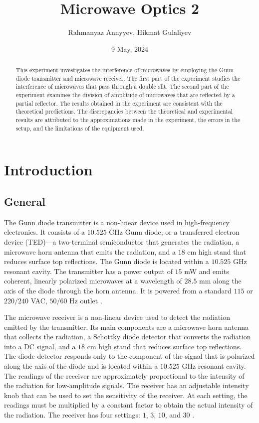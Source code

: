 \documentclass[10pt]{article}
\title{Microwave Optics 2}
\author{Rahmanyaz Annyyev, Hikmat Gulaliyev}
\date{9 May, 2024}
\begin{document}
\maketitle

\begin{abstract}
This experiment investigates the interference of microwaves by employing the Gunn diode transmitter and microwave receiver. The first part of the experiment studies the interference of microwaves that pass through a double slit. The second part of the experiment examines the division of amplitude of microwaves that are reflected by a partial reflector. The results obtained in the experiment are consistent with the theoretical predictions. The discrepancies between the theoretical and experimental results are attributed to the approximations made in the experiment, the errors in the setup, and the limitations of the equipment used.
\end{abstract}

\section{Introduction}

\subsection*{General}

The Gunn diode transmitter is a non-linear device used in high-frequency electronics. It consists of a $10.525$ GHz Gunn diode, or a transferred electron device (TED)---a two-terminal semiconductor that generates the radiation, a microwave horn antenna that emits the radiation, and a $18$ cm high stand that reduces surface top reflections. The Gunn diode is located within a $10.525$ GHz resonant cavity. The transmitter has a power output of $15$ mW and emits coherent, linearly polarized microwaves at a wavelength of $28.5$ mm along the axis of the diode through the horn antenna. It is powered from a standard $115$ or $220/240$ VAC, $50/60$ Hz outlet \cite{Carr_1996}.

The microwave receiver is a non-linear device used to detect the radiation emitted by the transmitter. Its main components are a microwave horn antenna that collects the radiation, a Schottky diode detector that converts the radiation into a DC signal, and a $18$ cm high stand that reduces surface top reflections. The diode detector responds only to the component of the signal that is polarized along the axis of the diode and is located within a $10.525$ GHz resonant cavity. The readings of the receiver are approximately proportional to the intensity of the radiation for low-amplitude signals. The receiver has an adjustable intensity knob that can be used to set the sensitivity of the receiver. At each setting, the readings must be multiplied by a constant factor to obtain the actual intensity of the radiation. The receiver has four settings: $1$, $3$, $10$, and $30$ \cite{Scherrer_2011}. 
\end{document}
